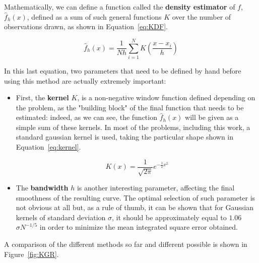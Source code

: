 \documentclass[a4paper, 11pt]{report}
\begin{document}
Mathematically, we can define a function called the \textbf{density estimator} of $f$, $\hat{f}_h(x)$, defined as a sum of such general functions $K$ over the number of observations drawn, as shown in Equation~\ref{eq:KDF}.

\begin{equation}
\label{eq:KDF}
\hat{f}_h(x) = \frac{1}{Nh} \sum_{i=1}^{N} K \left (\frac{x-x_i}{h} \right )
\end{equation}

In this last equation, two parameters that need to be defined by hand before using this method are actually extremely important:
\begin{itemize}
\item First, the \textbf{kernel} $K$, is a non-negative window function defined depending on the problem, as the "building block" of the final function that needs to be estimated: indeed, as we can see, the function $\hat{f}_h(x)$ will be given as a simple sum of these kernels. In most of the problems, including this work, a standard gaussian kernel is used, taking the particular shape shown in Equation~\ref{eq:kernel}.

\begin{equation}
\label{eq:kernel}
K(x) = \frac{1}{\sqrt{2 \pi}} e^{-\frac{1}{2} x^2}
\end{equation}

\item The \textbf{bandwidth} $h$ is another interesting parameter, affecting the final smoothness of the resulting curve. The optimal selection of such parameter is not obvious at all \cite{bandwidth} but, as a rule of thumb, it can be shown that for Gaussian kernels of standard deviation $\sigma$, it should be approximately equal to $1.06$ $\sigma N^{-1/5}$ in order to minimize the mean integrated square error obtained. 
\end{itemize}

A comparison of the different methods so far and different possible is shown in Figure~\ref{fig:KGR}.
\end{document}
